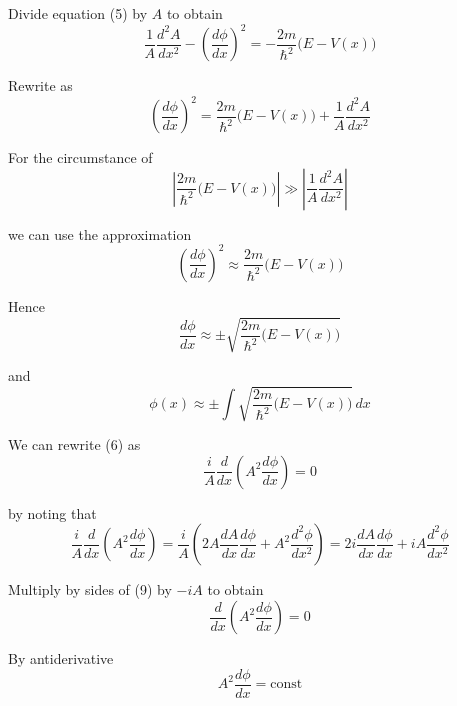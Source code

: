 Divide equation (5) by $A$ to obtain
\begin{equation*}
\frac{1}{A}\frac{d^2A}{dx^2}-\left(\frac{d\phi}{dx}\right)^2
=-\frac{2m}{\hbar^2}\bigl(E-V(x)\bigr)
\end{equation*}

Rewrite as
\begin{equation*}
\left(\frac{d\phi}{dx}\right)^2
=\frac{2m}{\hbar^2}\bigl(E-V(x)\bigr)+\frac{1}{A}\frac{d^2A}{dx^2}
\end{equation*}

For the circumstance of
\begin{equation*}
\left|\frac{2m}{\hbar^2}\bigl(E-V(x)\bigr)\right|
\gg
\left|\frac{1}{A}\frac{d^2A}{dx^2}\right|
\end{equation*}

we can use the approximation
\begin{equation*}
\left(\frac{d\phi}{dx}\right)^2\approx\frac{2m}{\hbar^2}\bigl(E-V(x)\bigr)
\end{equation*}

Hence
\begin{equation*}
\frac{d\phi}{dx}\approx\pm\sqrt{\frac{2m}{\hbar^2}\bigl(E-V(x)\bigr)}
\tag{7}
\end{equation*}

and
\begin{equation*}
\phi(x)\approx\pm\int\sqrt{\frac{2m}{\hbar^2}\bigl(E-V(x)\bigr)}\,dx
\tag{8}
\end{equation*}

We can rewrite (6) as
\begin{equation*}
\frac{i}{A}\frac{d}{dx}\left(A^2\frac{d\phi}{dx}\right)=0
\tag{9}
\end{equation*}

by noting that
\begin{equation*}
\frac{i}{A}\frac{d}{dx}\left(A^2\frac{d\phi}{dx}\right)
=\frac{i}{A}\left(2A\frac{dA}{dx}\frac{d\phi}{dx}+A^2\frac{d^2\phi}{dx^2}\right)
=2i\frac{dA}{dx}\frac{d\phi}{dx}+iA\frac{d^2\phi}{dx^2}
\end{equation*}

Multiply by sides of (9) by $-iA$ to obtain
\begin{equation*}
\frac{d}{dx}\left(A^2\frac{d\phi}{dx}\right)=0
\end{equation*}

By antiderivative
\begin{equation*}
A^2\frac{d\phi}{dx}=\text{const}
\end{equation*}

